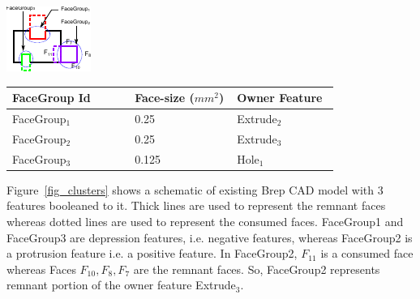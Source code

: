 \begin{enumerate}
\begin{minipage}{\linewidth}
\begin{minipage}[c]{0.48\linewidth}
\includegraphics[width=0.8\linewidth,valign=t]{images/facegroups_1.pdf}
 \label{fig_clusters}
\end{minipage}
\hfill
\begin{minipage}[c]{0.48\linewidth}
\label{tbl_clusters}
\begin{tabular}[h]{@{} p{0.3\linewidth} p{0.25\linewidth} p{0.25\linewidth}@{}} \toprule
\textbf{FaceGroup Id} & \textbf{Face-size ($mm^2$)}& \textbf{Owner Feature}\\ \midrule
FaceGroup$_1$ & 0.25 	&  Extrude$_2$\\
FaceGroup$_2$ & 0.25  & Extrude$_3$\\
FaceGroup$_3$ & 0.125 & Hole$_1$\\ \bottomrule
\end{tabular}
\end{minipage}
\end{minipage}


Figure~\ref{fig_clusters} shows a schematic of existing Brep CAD model with 3 features booleaned to it. Thick lines are used to represent the remnant faces whereas dotted lines are used to represent the consumed faces. FaceGroup1 and FaceGroup3 are depression features, i.e. negative features, whereas FaceGroup2 is a protrusion feature i.e. a positive feature. In FaceGroup2, $F_{11}$ is a consumed face whereas Faces $F_{10},F_8,F_7$ are the remnant faces. So, FaceGroup2 represents remnant portion of the owner feature Extrude$_3$.


\end{enumerate}
